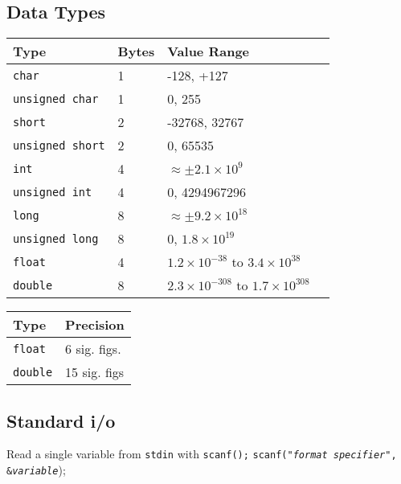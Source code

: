 \documentclass{lab}
\begin{document}
\begin{multicols}{2}
\subsection{Data Types}\label{sec:datatypes}

\begin{table}[H]
\begin{tabular}{|l|l|l|l|}
\hline
Type & Bytes & Value Range                             \\
\hline
\texttt{char}      & 1                  & -128, +127  \\
\texttt{unsigned char}	& 1				& 0, 255 \\
\texttt{short}     & 2                & -32768, 32767\\
\texttt{unsigned short} & 2			& 0, 65535 \\
\texttt{int}       & 4                & $\approx \pm 2.1\times 10^9$ \\
\texttt{unsigned int}	& 4				& 0, 4294967296 \\
\texttt{long}      & 8                  & $\approx \pm 9.2\times 10^{18}$ \\
\texttt{unsigned long} & 8				& 0, $1.8 \times 10^{19}$ \\
\texttt{float}       & 4  & $1.2\times 10^{-38}$ to $3.4 \times 10^{38}$    \\
\texttt{double}      & 8  & $2.3 \times 10^{-308}$ to $1.7 \times 10^{308}$    \\

\hline
\end{tabular}
\end{table}

\begin{table}[H]
\centering
\begin{tabular}{|l|l|}
\hline
Type & Precision \\
\hline
\texttt{float} & 6 sig. figs. \\
\texttt{double} & 15 sig. figs \\
\hline
\end{tabular}
\end{table}


\subsection{Standard i/o}

Read a single variable from \texttt{stdin} with \texttt{scanf();}
\texttt{scanf("\textit{format specifier}", \&\textit{variable}});


\end{multicols}
\end{document}
